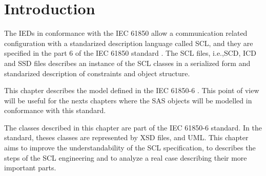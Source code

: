 \section{Introduction}

The \glspl{IED} in conformance with the 
IEC 61850 allow a communication related 
configuration with 
a standarized description language 
called \gls{SCL}, and they are specified 
in the part 6 of 
the IEC 61850 standard \cite{IEC61850-6:2004}.
The \gls{SCL} files, i.e.,\gls{SCD}, \gls{ICD} and \gls{SSD} 
files describes an instance of the 
\gls{SCL} classes in a serialized form 
and standarized description of constraints and object structure. 

This chapter describes the model defined 
in the IEC 61850-6 \cite{IEC61850-6:2004}. This 
point of view will be useful for the 
nexts chapters where the SAS objects will be 
modelled in conformance with this standard. 

The classes described in this chapter are part 
of the IEC 61850-6 standard. In the standard, 
theses classes are represented by \gls{XSD} files,
and \gls{UML}. This chapter aims to improve 
the understandability of the \gls{SCL} specification,   
to describes the steps of the \gls{SCL} engineering
and to analyze a real case describing their 
more important parts. 







